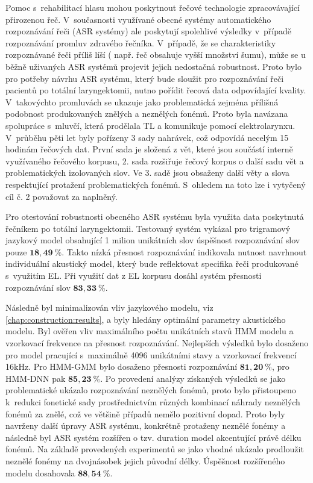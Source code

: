 Pomoc s~rehabilitací hlasu mohou poskytnout řečové technologie zpracovávající přirozenou řeč. V~současnosti využívané obecné systémy automatického rozpoznávání řeči (ASR systémy) ale poskytují spolehlivé výsledky v~případě rozpoznávání promluv zdravého řečníka. V~případě, že se charakteristiky rozpoznávané řeči příliš líší ( např. řeč obsahuje vyšší množství šumu), může se u běžně uživaných ASR systémů projevit jejich nedostačná robustnost. Proto bylo pro potřeby návrhu ASR systému, který bude sloužit pro rozpoznávání řeči pacientů po totální laryngektomii, nutno pořídit řecová data odpovídající kvality. V~takovýchto promluvách se ukazuje jako problematická zejména přílišná podobnost produkovaných znělých a neznělých fonémů. Proto byla navázana spolupráce s~mluvčí, která prodělala TL a komunikuje pomocí elektrolarynxu. V~průběhu pěti let byly pořízeny 3 sady nahrávek, což odpovídá necelým 15 hodinám řečových dat. První sada je složená z vět, které jsou součástí interně využívaného řečového korpusu, 2. sada rozšiřuje řečový korpus o další sadu vět a problematických izolovaných slov. Ve 3. sadě jsou obsaženy další věty a slova respektující protažení problematických fonémů.
S~ohledem na toto lze i vytyčený cíl č. 2 považovat za naplněný.

Pro otestování robustnosti obecného ASR systému byla využita data poskytnutá řečníkem po totální laryngektomii. Testovaný systém vykázal pro trigramový jazykový model obsahující 1 milion unikátních slov úspěšnost rozpoznávání slov pouze $\boldsymbol{18,49~\%}$. Takto nízká přesnost rozpoznávání indikovala nutnost navrhnout individuální akustický model, který bude reflektovat specifika řeči produkované s~využitím EL. Při využití dat z EL korpusu dosáhl systém přesnosti rozpoznávání slov $\boldsymbol{83,33~\%}$.

Následně byl minimalizován vliv jazykového modelu, viz \ref{chap:construction:results}, a byly hledány optimální parametry akustického modelu. Byl ověřen vliv maximálního počtu unikátních stavů HMM modelu a vzorkovací frekvence na přesnost rozpoznávání. Nejlepších výsledků bylo dosaženo pro model pracující s~maximálně 4096 unikátními stavy a vzorkovací frekvencí 16kHz. Pro HMM-GMM bylo dosaženo přesnosti rozpoznávání $\boldsymbol{81,20~\%}$, pro HMM-DNN pak $\boldsymbol{85,23~\%}$. Po provedení analýzy získaných výsledků se jako problematické ukázalo rozpoznávání neznělých fonémů, proto bylo přistoupeno  k~redukci fonetické sady prostřednictvím různých kombinací náhrady neznělých fonémů za znělé, což ve většině případů nemělo pozitivní dopad. Proto byly navrženy další úpravy ASR systému, konkrétně protaženy neznělé fonémy a následně byl ASR systém rozšířen o tzv. duration model akcentující právě délku fonémů. Na základě provedených experimentů se jako vhodné ukázalo prodloužit neznělé fonémy na dvojnásobek jejich původní délky. Úspěšnost rozšířeného modelu dosahovala $\boldsymbol{88,54~\%}$.


